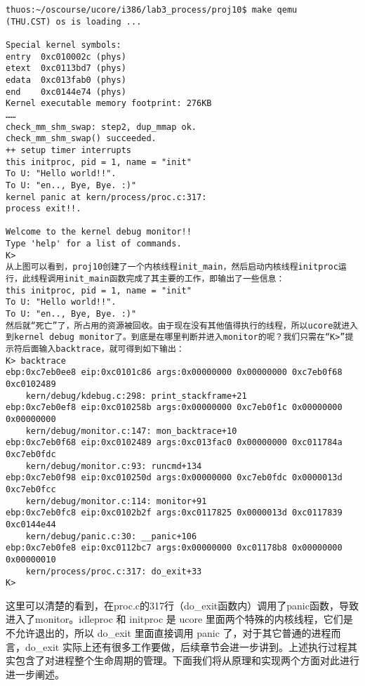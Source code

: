 \begin{lstlisting}
thuos:~/oscourse/ucore/i386/lab3_process/proj10$ make qemu
(THU.CST) os is loading ...

Special kernel symbols:
entry  0xc010002c (phys)
etext  0xc0113bd7 (phys)
edata  0xc013fab0 (phys)
end    0xc0144e74 (phys)
Kernel executable memory footprint: 276KB
……
check_mm_shm_swap: step2, dup_mmap ok.
check_mm_shm_swap() succeeded.
++ setup timer interrupts
this initproc, pid = 1, name = "init"
To U: "Hello world!!".
To U: "en.., Bye, Bye. :)"
kernel panic at kern/process/proc.c:317:
process exit!!.

Welcome to the kernel debug monitor!!
Type 'help' for a list of commands.
K>
从上图可以看到，proj10创建了一个内核线程init_main，然后启动内核线程initproc运行，此线程调用init_main函数完成了其主要的工作，即输出了一些信息：
this initproc, pid = 1, name = "init"
To U: "Hello world!!".
To U: "en.., Bye, Bye. :)"
然后就“死亡”了，所占用的资源被回收。由于现在没有其他值得执行的线程，所以ucore就进入到kernel debug monitor了。到底是在哪里判断并进入monitor的呢？我们只需在“K>”提示符后面输入backtrace，就可得到如下输出：
K> backtrace
ebp:0xc7eb0ee8 eip:0xc0101c86 args:0x00000000 0x00000000 0xc7eb0f68 0xc0102489 
    kern/debug/kdebug.c:298: print_stackframe+21
ebp:0xc7eb0ef8 eip:0xc010258b args:0x00000000 0xc7eb0f1c 0x00000000 0x00000000 
    kern/debug/monitor.c:147: mon_backtrace+10
ebp:0xc7eb0f68 eip:0xc0102489 args:0xc013fac0 0x00000000 0xc011784a 0xc7eb0fdc 
    kern/debug/monitor.c:93: runcmd+134
ebp:0xc7eb0f98 eip:0xc010250d args:0x00000000 0xc7eb0fdc 0x0000013d 0xc7eb0fcc 
    kern/debug/monitor.c:114: monitor+91
ebp:0xc7eb0fc8 eip:0xc0102b2f args:0xc0117825 0x0000013d 0xc0117839 0xc0144e44 
    kern/debug/panic.c:30: __panic+106
ebp:0xc7eb0fe8 eip:0xc0112bc7 args:0x00000000 0xc01178b8 0x00000000 0x00000010 
    kern/process/proc.c:317: do_exit+33
K>
\end{lstlisting}

这里可以清楚的看到，在proc.c的317行（do\_exit函数内）调用了panic函数，导致进入了monitor。idleproc
和 initproc 是 ucore 里面两个特殊的内核线程，它们是不允许退出的，所以
do\_exit 里面直接调用 panic 了，对于其它普通的进程而言，do\_exit
实际上还有很多工作要做，后续章节会进一步讲到。上述执行过程其实包含了对进程整个生命周期的管理。下面我们将从原理和实现两个方面对此进行进一步阐述。
